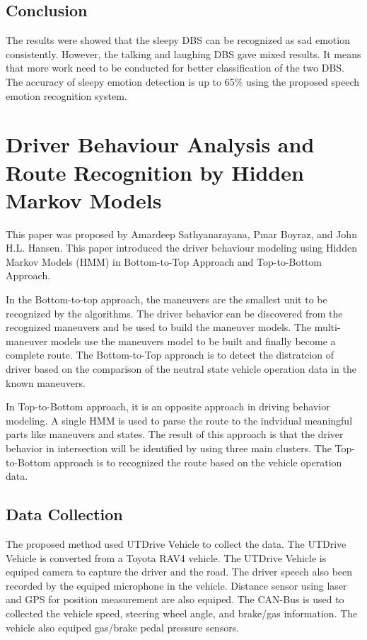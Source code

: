 \subsection{Conclusion}
The results were showed that the sleepy DBS can be recognized as sad emotion consistently. However, the talking and laughing DBS gave mixed results. It means that more work need to be conducted for better classification of the two DBS. The accuracy of sleepy emotion detection is up to 65\% using the proposed speech emotion recognition system.

\section{Driver Behaviour Analysis and Route Recognition by Hidden Markov Models}
This paper was proposed by Amardeep Sathyanarayana, Pınar Boyraz, and John H.L. Hansen. This paper introduced the driver behaviour modeling using Hidden Markov Models (HMM) in Bottom-to-Top Approach and Top-to-Bottom Approach.

In the Bottom-to-top approach, the maneuvers are the smallest unit to be recognized by the algorithms. The driver behavior can be discovered from the recognized maneuvers and be used to build the maneuver models. The multi-maneuver models use the maneuvers model to be built and finally become a complete route. The Bottom-to-Top approach is to detect the distratcion of driver based on the comparison of the neutral state vehicle operation data in the known maneuvers.

In Top-to-Bottom approach, it is an opposite approach in driving behavior modeling. A single HMM is used to parse the route to the indvidual meaningful parts like maneuvers and states. The result of this approach is that the driver behavior in intersection will be identified by using three main clusters. The Top-to-Bottom approach is to recognized the route based on the vehicle operation data.

\subsection{Data Collection}
The proposed method used UTDrive Vehicle to collect the data. The UTDrive Vehicle is converted from a Toyota RAV4 vehicle. The UTDrive Vehicle is equiped camera to capture the driver and the road. The driver speech also been recorded by the equiped microphone in the vehicle. Distance sensor using laser and GPS for position measurement are also equiped. The CAN-Bus is used to collected the vehicle speed, steering wheel angle, and brake/gas information. The vehicle also equiped gas/brake pedal pressure sensors. 


